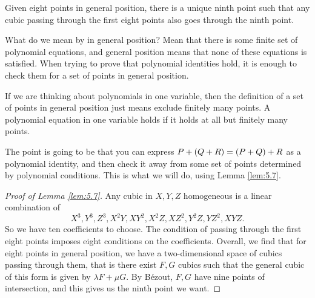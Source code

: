 \begin{lemma}
\label{lem:5.7}
Given eight points in general position, there is a unique ninth point such that any cubic passing through the first eight points also goes through the ninth point.
\end{lemma}

What do we mean by in general position? Mean that there is some finite set of polynomial equations, and general position means that none of these equations is satisfied. When trying to prove that polynomial identities hold, it is enough to check them for a set of points in general position.

\begin{example*}
If we are thinking about polynomials in one variable, then the definition of a set of points in general position just means exclude finitely many points. A polynomial equation in one variable holds if it holds at all but finitely many points.
\end{example*}

The point is going to be that you can express $ P + \br{Q + R} = \br{P + Q} + R $ as a polynomial identity, and then check it away from some set of points determined by polynomial conditions. This is what we will do, using Lemma \ref{lem:5.7}.

\begin{proof}[Proof of Lemma \ref{lem:5.7}]
Any cubic in $ X, Y, Z $ homogeneous is a linear combination of
$$ X^3, Y^3, Z^3, X^2Y, XY^2, X^2Z, XZ^2, Y^2Z, YZ^2, XYZ. $$
So we have ten coefficients to choose. The condition of passing through the first eight points imposes eight conditions on the coefficients. Overall, we find that for eight points in general position, we have a two-dimensional space of cubics passing through them, that is there exist $ F, G $ cubics such that the general cubic of this form is given by $ \lambda F + \mu G $. By Bézout, $ F, G $ have nine points of intersection, and this gives us the ninth point we want.
\end{proof}


\begin{center}
\end{center}

